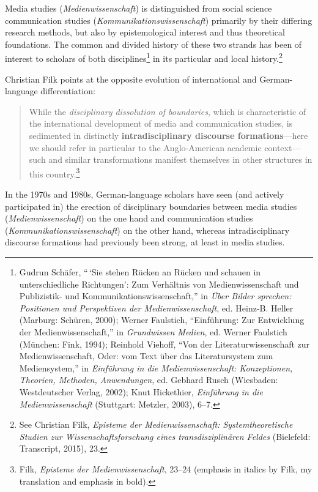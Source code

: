 \documentclass{tufte-handout}
\begin{document}
Media studies (\emph{Medienwissenschaft}) is distinguished from social
science communication studies (\emph{Kommunikationswissenschaft})
primarily by their differing research methods, but also by
epistemological interest and thus theoretical foundations. The common
and divided history of these two strands has been of interest to
scholars of both disciplines\footnote{Gudrun Schäfer, ``\,`Sie stehen
  Rücken an Rücken und schauen in unterschiedliche Richtungen': Zum
  Verhältnis von Medienwissenschaft und Publizistik- und
  Kommunikationswissenschaft,'' in \emph{Über Bilder sprechen:
  Positionen und Perspektiven der Medienwissenschaft}, ed. Heinz-B.
  Heller (Marburg: Schüren, 2000); Werner Faulstich, ``Einführung: Zur
  Entwicklung der Medienwissenschaft,'' in \emph{Grundwissen Medien},
  ed. Werner Faulstich (München: Fink, 1994); Reinhold Viehoff, ``Von
  der Literaturwissenschaft zur Medienwissenschaft, Oder: vom Text über
  das Literatursystem zum Mediensystem,'' in \emph{Einführung in die
  Medienwissenschaft: Konzeptionen, Theorien, Methoden, Anwendungen},
  ed. Gebhard Rusch (Wiesbaden: Westdeutscher Verlag, 2002); Knut
  Hickethier, \emph{Einführung in die Medienwissenschaft} (Stuttgart:
  Metzler, 2003), 6--7.} in its particular and local history.\footnote{See
  Christian Filk, \emph{Episteme der Medienwissenschaft:
  Systemtheoretische Studien zur Wissenschaftsforschung eines
  transdisziplinären Feldes} (Bielefeld: Transcript, 2015), 23.}

Christian Filk points at the opposite evolution of international and
German-language differentiation:

\begin{quote}
While the \emph{disciplinary dissolution of boundaries}, which is
characteristic of the international development of media and
communication studies, is sedimented in distinctly
\textbf{intradisciplinary discourse formations}---here we should refer
in particular to the Anglo-American academic context---such and similar
transformations manifest themselves in other structures in this
country.\footnote{Filk, \emph{Episteme der Medienwissenschaft}, 23--24
  (emphasis in italics by Filk, my translation and emphasis in bold).}
\end{quote}

\noindent In the 1970s and 1980s, German-language scholars have seen (and actively
participated in) the erection of disciplinary boundaries between media
studies (\emph{Medienwissenschaft}) on the one hand and communication
studies (\emph{Kommunikationswissenschaft}) on the other hand, whereas
intradisciplinary discourse formations had previously been strong, at
least in media studies.
\end{document}
